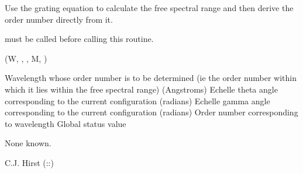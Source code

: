 \begin{manroutinedescription}
     Use the grating equation to calculate the free spectral range and then
     derive the order number directly from it.

     {} must be called before calling this routine.

     {} {} (W, {}, {%
}, M, {})

\begin{manparametertable}
 Wavelength %
whose order number is to be
                                      determined (ie the order number within
                                      which it lies within the free spectral
                                      range) (Angstroms)
Echelle theta angle corresponding to the
                                      current configuration (radians)
Echelle gamma angle corresponding to the
                                      current configuration (radians)
 Order %
number corresponding to wavelength
 Global status value
\end{manparametertable}
     None known.

     C.J. Hirst  {}  ({}::{})

\end{manroutinedescription}
